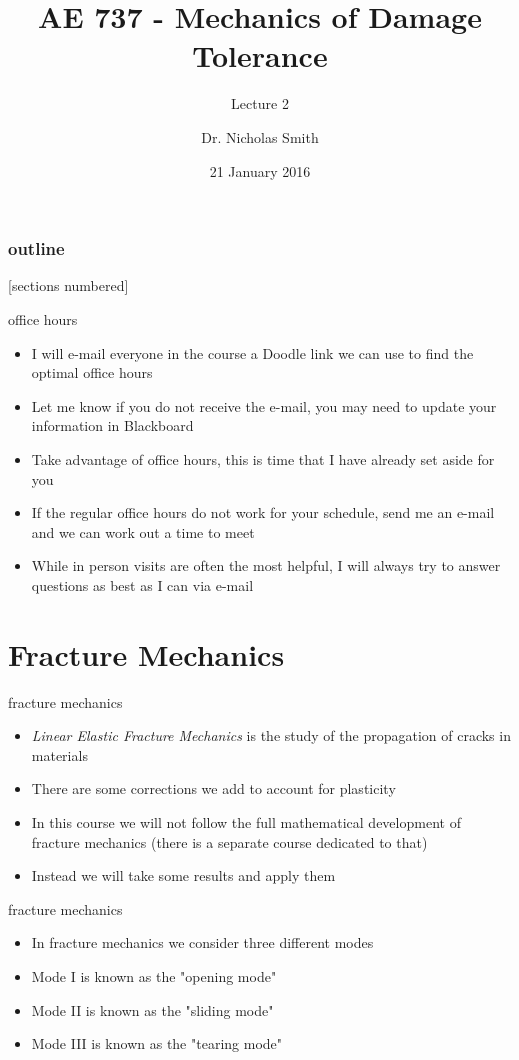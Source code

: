 \documentclass[10pt]{beamer}
\title{AE 737 - Mechanics of Damage Tolerance}
\subtitle{Lecture 2}
\date{21 January 2016}
\author{Dr. Nicholas Smith}
\institute{Wichita State University, Department of Aerospace Engineering}
\begin{document}
\maketitle

\begin{frame}
  \frametitle{outline}
  [sections numbered]
  \tableofcontents[hideallsubsections]
\end{frame}

\begin{frame}{office hours}
  \begin{itemize}
  \item I will e-mail everyone in the course a Doodle link we can use to find the optimal office hours
  \item Let me know if you do not receive the e-mail, you may need to update your information in Blackboard
  \item Take advantage of office hours, this is time that I have already set aside for you
  \item If the regular office hours do not work for your schedule, send me an e-mail and we can work out a time to meet
  \item While in person visits are often the most helpful, I will always try to answer questions as best as I can via e-mail
  \end{itemize}
\end{frame}

\section{Fracture Mechanics}

\begin{frame}{fracture mechanics}
	\begin{itemize}
		\item \emph{Linear Elastic Fracture Mechanics} is the study of the propagation of cracks in materials
		\item There are some corrections we add to account for plasticity
		\item In this course we will not follow the full mathematical development of fracture mechanics (there is a separate course dedicated to that)
		\item Instead we will take some results and apply them
	\end{itemize}
\end{frame}

\begin{frame}{fracture mechanics}
	\begin{itemize}
		\item In fracture mechanics we consider three different modes
		\item Mode I is known as the "opening mode"
		\item Mode II is known as the "sliding mode"
		\item Mode III is known as the "tearing mode"
	\end{itemize}
\end{frame}
\end{document}
